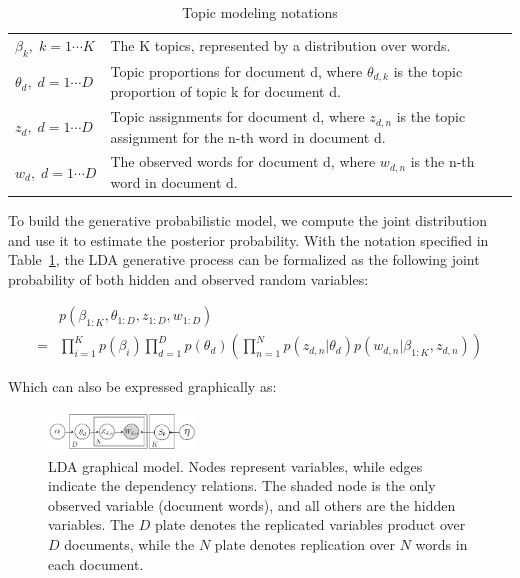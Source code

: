 \documentclass[conference]{IEEEtran}
\begin{document}
\begin{table}[h]
	\center
	\begin{tabular}{l p{5.5cm}}
$\beta_k,\; k = 1 \cdots K$& The K topics, represented by a distribution over words.\\
$\theta_d,\; d = 1 \cdots D$& Topic proportions for document d, where $\theta_{d,k}$ is the topic proportion of topic k for document d.\\
$z_d,\; d = 1 \cdots D$& Topic assignments for document d, where $z_{d,n}$ is the topic assignment for the n-th word in document d.\\
$w_d,\; d = 1 \cdots D$& The observed words for document d, where $w_{d,n}$ is the n-th word in document d.\\
	\end{tabular}
	\caption{Topic modeling notations}
	\label{tm_notations}
\end{table}
	
%
To build the generative probabilistic model, we compute the joint distribution and use it to estimate the posterior probability. With the notation specified in Table~\ref{tm_notations}, the LDA generative process can be formalized as the following joint probability of both hidden and observed random variables:

\begin{align*}
	&p(\beta_{1:K}, \theta_{1:D}, z_{1:D}, w_{1:D})\\
	=& \prod_{i=1}^K p(\beta_i)\prod_{d=1}^D p(\theta_d) \left( \prod_{n=1}^N p(z_{d,n} | \theta_d) p(w_{d,n} | \beta_{1:K}, z_{d,n})\right)
\end{align*}

Which can also be expressed graphically as:
\begin{figure}[h]
	\center
	\includegraphics[width=0.35\textwidth]{fig/gm.png}
	\caption{LDA graphical model. Nodes represent variables, while edges indicate the dependency relations. The shaded node is the only observed variable (document words), and all others are the hidden variables. The $D$ plate denotes the replicated variables product over $D$ documents, while the $N$ plate denotes replication over $N$ words in each document.}
	\label{graphical_model}
\end{figure}
\end{document}
